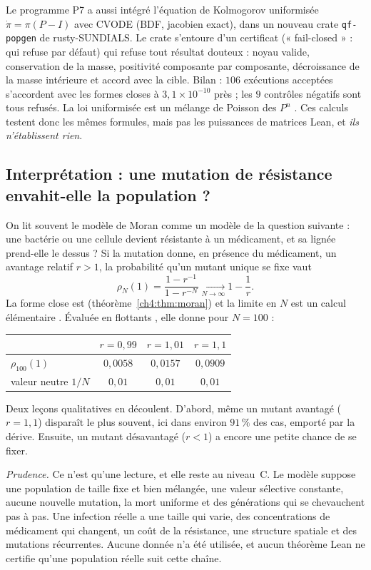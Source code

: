 \begin{numbox}
\tierX{} Le programme P7 a aussi intégré l'équation de Kolmogorov uniformisée $\dot\pi=\pi(P-I)$ avec CVODE (BDF, jacobien
exact), dans un nouveau crate \texttt{qf-popgen} de rusty-SUNDIALS. Le crate s'entoure d'un certificat (« fail-closed » : qui refuse par défaut) qui refuse
tout résultat douteux : noyau valide, conservation de la masse, positivité composante par composante,
décroissance de la masse intérieure et accord avec la cible. Bilan : $106$ exécutions acceptées s'accordent avec
les formes closes à $3{,}1\times10^{-10}$ près ; les $9$ contrôles négatifs sont tous refusés. La loi
uniformisée est un mélange de Poisson des $P^n$ \tierC. Ces calculs testent donc les mêmes formules, mais pas les
puissances de matrices Lean, et \emph{ils n'établissent rien}.
\end{numbox}

\subsection{Interprétation : une mutation de résistance envahit-elle la population ?}

\begin{physbox}
\tierC{} On lit souvent le modèle de Moran comme un modèle de la question suivante : une bactérie ou une cellule devient
résistante à un médicament, et sa lignée prend-elle le dessus ? Si la mutation donne, en présence du
médicament, un avantage relatif $r>1$, la probabilité qu'un mutant unique se fixe vaut
\[
\rho_N(1)=\frac{1-r^{-1}}{1-r^{-N}}\xrightarrow[N\to\infty]{}1-\frac1r .
\]
La forme close est \tierA{} (théorème~\ref{ch4:thm:moran}) et la limite en $N$ est un calcul élémentaire \tierC.
Évaluée en flottants \tierX, elle donne pour $N=100$ :
\begin{center}\small
\begin{tabular}{lccc}
\toprule
& $r=0{,}99$ & $r=1{,}01$ & $r=1{,}1$\\
\midrule
$\rho_{100}(1)$ & $0{,}0058$ & $0{,}0157$ & $0{,}0909$\\
valeur neutre $1/N$ & $0{,}01$ & $0{,}01$ & $0{,}01$\\
\bottomrule
\end{tabular}
\end{center}
Deux leçons qualitatives en découlent. D'abord, même un mutant avantagé ($r=1{,}1$) disparaît le plus souvent, ici
dans environ $91\,\%$ des cas, emporté par la dérive. Ensuite, un mutant désavantagé ($r<1$) a encore une petite
chance de se fixer.

\emph{Prudence.} Ce n'est qu'une lecture, et elle reste au niveau~C. Le modèle suppose une population de taille
fixe et bien mélangée, une valeur sélective constante, aucune nouvelle mutation, la mort uniforme et des
générations qui se chevauchent pas à pas. Une infection réelle a une taille qui varie, des concentrations de
médicament qui changent, un coût de la résistance, une structure spatiale et des mutations récurrentes. Aucune
donnée n'a été utilisée, et aucun théorème Lean ne certifie qu'une population réelle suit cette chaîne.
\end{physbox}

